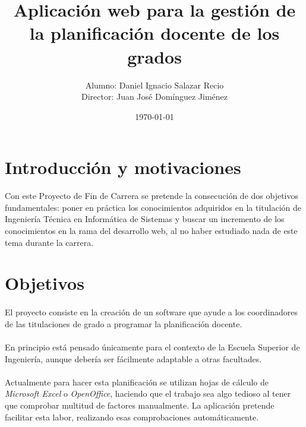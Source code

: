 \documentclass[a4paper,11pt]{article} %
\title{Aplicación web para la gestión de la planificación docente de los grados} %
\author{Alumno: Daniel Ignacio Salazar Recio\\Director: Juan José Domínguez Jiménez} %
\date{\today} %
\begin{document}
\maketitle %


\tableofcontents %

\section{Introducción y motivaciones}
Con este Proyecto de Fin de Carrera se pretende la consecución de dos objetivos fundamentales: poner en práctica los conocimientos adquiridos en la titulación de Ingeniería Técnica en Informática de Sistemas y buscar un incremento de los conocimientos en la rama del desarrollo web, al no haber estudiado nada de este tema durante la carrera.
\section{Objetivos}

\paragraph{}
El proyecto consiste en la creación de un software que ayude a los coordinadores de las titulaciones de grado a programar la planificación docente.
\paragraph{}
En principio está pensado únicamente para el contexto de la Escuela Superior de Ingeniería, aunque debería ser fácilmente adaptable a otras facultades.
\paragraph{}
Actualmente para hacer esta planificación se utilizan hojas de cálculo de {\em Microsoft Excel} o {\em OpenOffice}, haciendo que el trabajo sea algo tedioso al tener que comprobar multitud de factores manualmente. La aplicación pretende facilitar esta labor, realizando esas comprobaciones automáticamente. 
\end{document}
